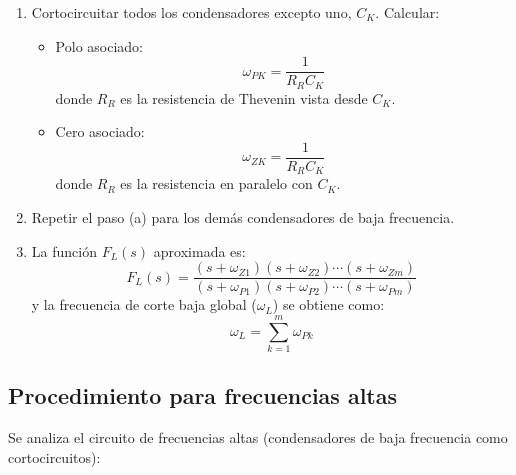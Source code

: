 \begin{enumerate}
	\item[\textbf{a)}] Cortocircuitar todos los condensadores excepto uno, \( C_K \). Calcular:
	\begin{itemize}
		\item Polo asociado:
		\begin{equation}
			\omega_{PK} = \frac{1}{R_R C_K}
		\end{equation}
		donde \( R_R \) es la resistencia de Thevenin vista desde \( C_K \).
		\item Cero asociado:
		\begin{equation}
			\omega_{ZK} = \frac{1}{R_R C_K}
		\end{equation}
		donde \( R_R \) es la resistencia en paralelo con \( C_K \).
	\end{itemize}
	
	\item[\textbf{b)}] Repetir el paso (a) para los demás condensadores de baja frecuencia.
	
	\item[\textbf{c)}] La función \( F_L(s) \) aproximada es:
	\begin{equation}
		F_L(s) = \frac{(s + \omega_{Z1})(s + \omega_{Z2}) \cdots (s + \omega_{Zm})}{(s + \omega_{P1})(s + \omega_{P2}) \cdots (s + \omega_{Pm})}
	\end{equation}
	y la frecuencia de corte baja global (\( \omega_L \)) se obtiene como:
	\[
	\omega_L = \sum_{k=1}^{m} \omega_{Pk}
	\]
\end{enumerate}

\subsection{Procedimiento para frecuencias altas}

Se analiza el circuito de frecuencias altas (condensadores de baja frecuencia como cortocircuitos):

